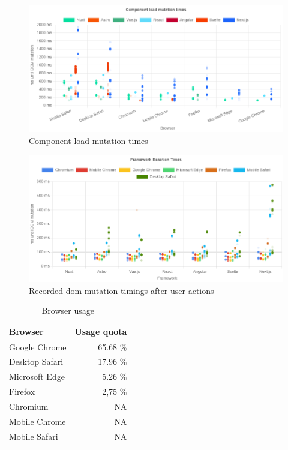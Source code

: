 \documentclass[a4paper, 12pt]{article}
\begin{document}
\begin{figure}[h]
  \centering
  \includegraphics[width=0.8\linewidth, keepaspectratio]{img/playwright-results/pageLoadMutations/total.png}
  \caption{Component load mutation times}
  \label{fig:Playwright:pageLoadMutations:total}
\end{figure}

\begin{figure}[h]
  \centering
  \includegraphics[width=0.8\linewidth, keepaspectratio]{img/playwright-results/userActions_byUserAction/total.png}
  \caption{Recorded \acrshort{dom} mutation timings after user actions}
  \label{fig:playwrightResults:total}
\end{figure}

\begin{table}[h]
  \centering
  \begin{tabular}{|l|r|}
    \hline
    \textbf{Browser}  & \textbf{Usage quota} \\ \hline
    Google Chrome     & 65.68 \% \\ \hline
    Desktop Safari    & 17.96 \% \\ \hline
    Microsoft Edge    & 5.26 \% \\ \hline
    Firefox           & 2,75 \% \\ \hline
    Chromium          & NA \\ \hline
    Mobile Chrome     & NA \\ \hline
    Mobile Safari     & NA \\ \hline
  \end{tabular}
  \caption{Browser usage \citep{browserUsage}}
  \label{tab:browserUsage}
\end{table}
\end{document}
